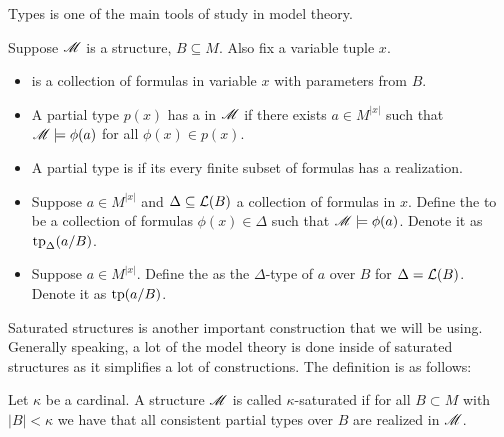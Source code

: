 Types is one of the main tools of study in model theory.
\begin{Definition}
  Suppose $\mathscr M$ is a structure, $B \subseteq M$.
  Also fix a variable tuple $x$.
  \begin{itemize}
  \item {} is a collection of formulas in variable $x$ with parameters from $B$.
  \item A partial type $p(x)$ has a  in $\mathscr M$ if there exists $a \in M^{|x|}$ such that
    $\mathscr M \models \phi(a)$ for all $\phi(x) \in p(x)$.
  \item A partial type is  if its every finite subset of formulas has a realization.
  \item Suppose $a \in M^{|x|}$ and $\Delta \subseteq \mathcal L(B)$ a collection of formulas in $x$.
    Define the  to be a collection of formulas $\phi(x) \in \Delta$
    such that $\mathscr M \models \phi(a)$.
    Denote it as $\operatorname{tp}_{\Delta}(a/B)$.
  \item Suppose $a \in M^{|x|}$.
    Define the  as the $\Delta$-type of $a$ over $B$ for $\Delta = \mathcal L(B)$.
    Denote it as $\operatorname{tp}(a/B)$.
  \end{itemize}
\end{Definition}

Saturated structures is another important construction that we will be using.
Generally speaking, a lot of the model theory is done inside of saturated structures as it simplifies a lot of constructions.
The definition is as follows:
\begin{Definition}
  Let $\kappa$ be a cardinal.
  A structure $\mathscr M$ is called $\kappa$-saturated if for all $B \subset M$ with $|B| < \kappa$
  we have that all consistent partial types over $B$ are realized in $\mathscr M$.
\end{Definition}

